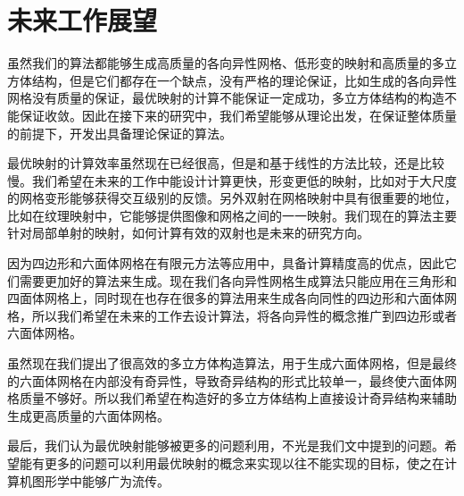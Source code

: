 \section{未来工作展望}
虽然我们的算法都能够生成高质量的各向异性网格、低形变的映射和高质量的多立方体结构，但是它们都存在一个缺点，没有严格的理论保证，比如生成的各向异性网格没有质量的保证，最优映射的计算不能保证一定成功，多立方体结构的构造不能保证收敛。因此在接下来的研究中，我们希望能够从理论出发，在保证整体质量的前提下，开发出具备理论保证的算法。

最优映射的计算效率虽然现在已经很高，但是和基于线性的方法比较，还是比较慢。我们希望在未来的工作中能设计计算更快，形变更低的映射，比如对于大尺度的网格变形能够获得交互级别的反馈。另外双射在网格映射中具有很重要的地位，比如在纹理映射中，它能够提供图像和网格之间的一一映射。我们现在的算法主要针对局部单射的映射，如何计算有效的双射也是未来的研究方向。

因为四边形和六面体网格在有限元方法等应用中，具备计算精度高的优点，因此它们需要更加好的算法来生成。现在我们各向异性网格生成算法只能应用在三角形和四面体网格上，同时现在也存在很多的算法用来生成各向同性的四边形和六面体网格，所以我们希望在未来的工作去设计算法，将各向异性的概念推广到四边形或者六面体网格。

虽然现在我们提出了很高效的多立方体构造算法，用于生成六面体网格，但是最终的六面体网格在内部没有奇异性，导致奇异结构的形式比较单一，最终使六面体网格质量不够好。所以我们希望在构造好的多立方体结构上直接设计奇异结构来辅助生成更高质量的六面体网格。

最后，我们认为最优映射能够被更多的问题利用，不光是我们文中提到的问题。希望能有更多的问题可以利用最优映射的概念来实现以往不能实现的目标，使之在计算机图形学中能够广为流传。
